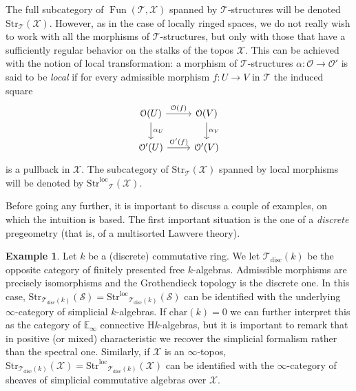 \documentclass[12pt,a4paper,reqno]{amsart}
\theoremstyle{plain}
\theoremstyle{definition}
\newtheorem{eg-intro}[thm-intro]{Example}
\theoremstyle{remark}
\numberwithin{equation}{section}
\begin{document}
The full subcategory of $\operatorname{Fun}({\mathcal T}, {\mathcal X})$ spanned by ${\mathcal T}$-structures will be denoted ${\mathrm{Str}}_{\mathcal T}({\mathcal X})$.
However, as in the case of locally ringed spaces, we do not really wish to work with all the morphisms of ${\mathcal T}$-structures, but only with those that have a sufficiently regular behavior on the stalks of the topos ${\mathcal X}$. This can be achieved with the notion of local transformation: a morphism of ${\mathcal T}$-structures $\alpha \colon {\mathcal O} \to {\mathcal O}'$ is said to be \emph{local} if for every admissible morphism $f \colon U \to V$ in ${\mathcal T}$ the induced square
\[ \begin{tikzcd}
	{\mathcal O}(U) \arrow{r}{{\mathcal O}(f)} \arrow{d}{\alpha_U} & {\mathcal O}(V) \arrow{d}{\alpha_V} \\
	{\mathcal O}'(U) \arrow{r}{{\mathcal O}'(f)} & {\mathcal O}'(V)
\end{tikzcd} \]
is a pullback in ${\mathcal X}$. The subcategory of ${\mathrm{Str}}_{\mathcal T}({\mathcal X})$ spanned by local morphisms will be denoted by ${\mathrm{Str}^\mathrm{loc}}_{\mathcal T}({\mathcal X})$.

Before going any further, it is important to discuss a couple of examples, on which the intuition is based.
The first important situation is the one of a \emph{discrete} pregeometry (that is, of a multisorted Lawvere theory).

\begin{eg-intro} \label{eg:Tdisc}
	Let $k$ be a (discrete) commutative ring. We let ${{\mathcal T}_{\mathrm{disc}}(k)}$ be the opposite category of finitely presented free $k$-algebras. Admissible morphisms are precisely isomorphisms and the Grothendieck topology is the discrete one.
	In this case, ${\mathrm{Str}}_{{\mathcal T}_{\mathrm{disc}}(k)}({\mathcal S}) = {\mathrm{Str}^\mathrm{loc}}_{{\mathcal T}_{\mathrm{disc}}(k)}({\mathcal S})$ can be identified with the underlying $\infty$-category of simplicial $k$-algebras. If $\mathrm{char}(k) = 0$ we can further interpret this as the category of $\mathbb E_\infty$ connective $\mathrm Hk$-algebras, but it is important to remark that in positive (or mixed) characteristic we recover the simplicial formalism rather than the spectral one.
	Similarly, if ${\mathcal X}$ is an $\infty$-topos, ${\mathrm{Str}}_{{\mathcal T}_{\mathrm{disc}}(k)}({\mathcal X}) = {\mathrm{Str}^\mathrm{loc}}_{{\mathcal T}_{\mathrm{disc}}(k)}({\mathcal X})$ can be identified with the $\infty$-category of sheaves of simplicial commutative algebras over ${\mathcal X}$.
\end{eg-intro}
\end{document}
